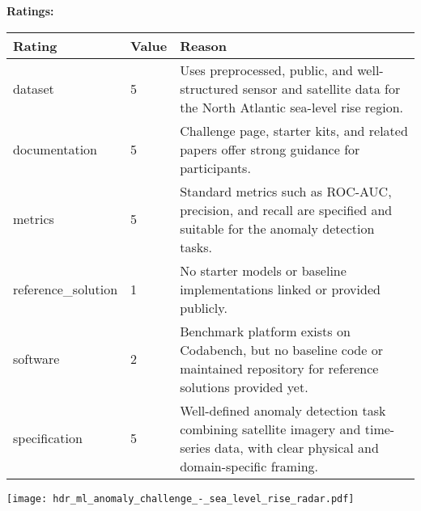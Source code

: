 {{{\bf Ratings:} ~ \\

\begin{tabular}{p{} p{} p{}}
\hline
Rating & Value & Reason \\
\hline
dataset & 5 & Uses preprocessed, public, and well-structured sensor and satellite data for the
North Atlantic sea-level rise region.
 \\
documentation & 5 & Challenge page, starter kits, and related papers offer strong guidance for participants.
 \\
metrics & 5 & Standard metrics such as ROC-AUC, precision, and recall are specified and suitable
for the anomaly detection tasks.
 \\
reference\_solution & 1 & No starter models or baseline implementations linked or provided publicly.
 \\
software & 2 & Benchmark platform exists on Codabench, but no baseline code or maintained repository
for reference solutions provided yet.
 \\
specification & 5 & Well-defined anomaly detection task combining satellite imagery and time-series data,
with clear physical and domain-specific framing.
 \\
\hline
\end{tabular}

\texttt{[image: hdr\_ml\_anomaly\_challenge\_-\_sea\_level\_rise\_radar.pdf]}
}}
\clearpage